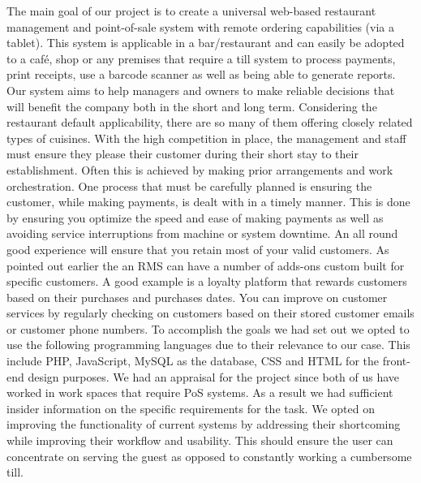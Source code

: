 The main goal of our project is to create a universal web-based restaurant management and point-of-sale system with remote ordering capabilities (via a tablet). This system is applicable in a bar/restaurant and can easily be adopted to a café, shop or any premises that require a till system to process payments, print receipts, use a barcode scanner as well as being able to generate reports. Our system aims to help managers and owners to make reliable decisions that will benefit the company both in the short and long term.
\newline
\newline
Considering the restaurant default applicability, there are so many of them offering closely related types of cuisines. With the high competition in place, the management and staff must ensure they please their customer during their short stay to their establishment. Often this is achieved by making prior arrangements and work orchestration. One process that must be carefully planned is ensuring the customer, while making payments, is dealt with in a timely manner. This is done by ensuring you optimize the speed and ease of making payments as well as avoiding service interruptions from machine or system downtime. An all round good experience will ensure that you retain most of your valid customers.  
\newline
\newline
As pointed out earlier the an RMS can have a number of adds-ons custom built for specific customers. A good example is a loyalty platform that rewards customers based on their purchases and purchases dates. You can improve on customer services by regularly checking on customers based on their stored customer emails or customer phone numbers.
\newline
\newline
To accomplish the goals we had set out we opted to use the following programming languages due to their relevance to our case. This include PHP, JavaScript, MySQL as the database, CSS and HTML for the front-end design purposes. We had an appraisal for the project since both of us have worked in work spaces that require PoS systems. As a result we had sufficient insider information on the specific requirements for the task. We opted on improving the functionality of current systems by addressing their shortcoming while improving their workflow and usability. This should ensure the user can concentrate on serving the guest as opposed to constantly working a cumbersome till. 
\newline
